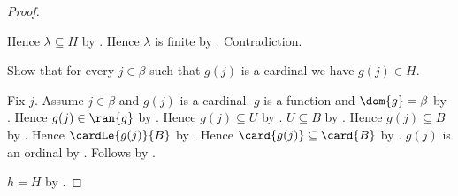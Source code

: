 \begin{proof}
\begin{subproof}
        Hence $\lambda\subseteq H$
            by .
        Hence $\lambda$ is finite by .
        Contradiction.
    \end{subproof}
    Show that for every $j\in\beta$ such that $g(j)$ is a cardinal
        we have $g(j)\in H$.
    \begin{subproof}
        Fix $j$.
        Assume $j\in\beta$ and $g(j)$ is a cardinal.
        $g$ is a function and $\dom{g}=\beta$
            by .
        Hence $g(j)\in\ran{g}$ by .
        Hence $g(j)\subseteq U$ by .
        $U\subseteq B$ by .
        Hence $g(j)\subseteq B$ by .
        Hence $\cardLe{g(j)}{B}$ by .
        Hence $\card{g(j)}\subseteq\card{B}$
            by .
        $g(j)$ is an ordinal by .
        Follows by .
    \end{subproof}
    $h=H$ by .
\end{proof}

